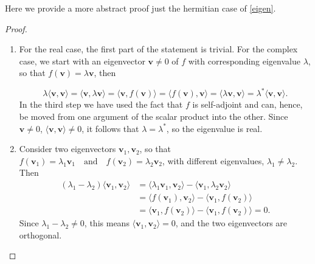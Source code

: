 \documentclass[a4paper,12pt]{report}
\begin{document}
\begin{appendices}
Here we provide a more abstract proof just the hermitian case of \cref{eigen}.

\begin{proof}
\begin{enumerate}[label=(\(P\)\arabic*)]
    \item For the real case, the first part of the statement is trivial. For the complex case, we start with an eigenvector \( \mathbf{v} \neq 0 \) of \( f \) with corresponding eigenvalue \( \lambda \), so that \(f(\mathbf{v}) = \lambda \mathbf{v}\), then

    \begin{equation}
        \lambda \langle \mathbf{v}, \mathbf{v} \rangle 
        = \langle \mathbf{v}, \lambda \mathbf{v} \rangle 
        = \langle \mathbf{v}, f(\mathbf{v}) \rangle 
        = \langle f(\mathbf{v}), \mathbf{v} \rangle 
        = \langle \lambda \mathbf{v}, \mathbf{v} \rangle 
        = \lambda^* \langle \mathbf{v}, \mathbf{v} \rangle.
    \end{equation}
    In the third step we have used the fact that \( f \) is self-adjoint and can, hence, be moved from one argument of the scalar product into the other. Since \( \mathbf{v} \neq 0 \), \( \langle \mathbf{v}, \mathbf{v} \rangle \neq 0 \), it follows that \( \lambda = \lambda^* \), so the eigenvalue is real.
    
    \item Consider two eigenvectors \( \mathbf{v}_1, \mathbf{v}_2 \), so that \(f(\mathbf{v}_1) = \lambda_1 \mathbf{v}_1 \quad \text{and} \quad f(\mathbf{v}_2) = \lambda_2 \mathbf{v}_2\), with different eigenvalues, \( \lambda_1 \neq \lambda_2 \). Then
    \begin{equation}
        \begin{aligned} 
        (\lambda_1 - \lambda_2) \langle \mathbf{v}_1, \mathbf{v}_2 \rangle 
        &= \langle \lambda_1 \mathbf{v}_1, \mathbf{v}_2 \rangle 
        - \langle \mathbf{v}_1, \lambda_2 \mathbf{v}_2 \rangle \\
        &= \langle f(\mathbf{v}_1), \mathbf{v}_2 \rangle 
        - \langle \mathbf{v}_1, f(\mathbf{v}_2) \rangle \\
        &= \langle \mathbf{v}_1, f(\mathbf{v}_2) \rangle - \langle \mathbf{v}_1, f(\mathbf{v}_2) \rangle
        = 0.
        \end{aligned} 
    \end{equation}
    Since \( \lambda_1 - \lambda_2 \neq 0 \), this means \( \langle \mathbf{v}_1, \mathbf{v}_2 \rangle = 0 \), and the two eigenvectors are orthogonal.
\end{enumerate}


\end{proof}
\end{appendices}
\end{document}
